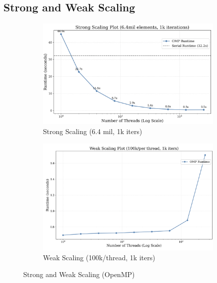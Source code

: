 \documentclass[a4paper,10pt]{article}
\begin{document}
\subsection{Strong and Weak Scaling}
\begin{figure}
     \centering
     \begin{subfigure}[b]{0.45\textwidth}
         \centering
         \includegraphics[width=\textwidth]{../images/2_openmp/strong_scaling.png}
         \caption{Strong Scaling (6.4 mil, 1k iters)}
         \label{fig:2_omp_strong_scaling}
     \end{subfigure}
     \hfill
     \begin{subfigure}[b]{0.45\textwidth}
         \centering
         \includegraphics[width=\textwidth]{../images/2_openmp/weak_scaling.png}
         \caption{Weak Scaling (100k/thread, 1k iters)}
         \label{fig:2_omp_weak_scaling}
     \end{subfigure}
     \caption{Strong and Weak Scaling (OpenMP) }
     \label{fig:2_omp_strong_weak}
\end{figure}
\end{document}
